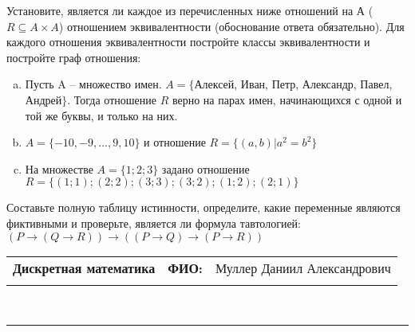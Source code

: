 \documentclass[10pt]{exam}
\newcommand{\class}{Дискретная математика}
\newcommand{\examdate}{}
\begin{document}
\begin{questions}
\question
Установите, является ли каждое из перечисленных ниже отношений на А ($R \subseteq A \times A$) отношением эквивалентности (обоснование ответа обязательно). Для каждого отношения эквивалентности постройте классы 
эквивалентности и постройте граф отношения:
\begin{enumerate} [a)]\setcounter{enumi}{0}
\item Пусть A – множество имен. $A = \{ $Алексей, Иван, Петр, Александр, Павел, Андрей$ \}$. Тогда отношение $R$ верно на парах имен, начинающихся с одной и той же буквы, и только на них.
\item $A = \{-10, -9, … , 9, 10\}$ и отношение $ R = \{(a,b)|a^{2} = b^{2}\}$
\item На множестве $A = \{1; 2; 3\}$ задано отношение $R = \{(1; 1); (2; 2); (3; 3); (3; 2); (1; 2); (2; 1)\}$
\end{enumerate}\question Составьте полную таблицу истинности, определите, какие переменные являются фиктивными и проверьте, является ли формула тавтологией:
$(P \rightarrow (Q \rightarrow R)) \rightarrow ((P \rightarrow Q) \rightarrow (P \rightarrow R))$

\end{questions}
\newpage
\begin{flushright}
\begin{tabular}{p{2.8in} r l}
\textbf{\class} & \textbf{ФИО:} &Муллер Даниил Александрович
\\

\textbf{\examdate} &&\\
\end{tabular}\\
\end{flushright}
\rule[1ex]{\textwidth}{.1pt}
\end{document}
